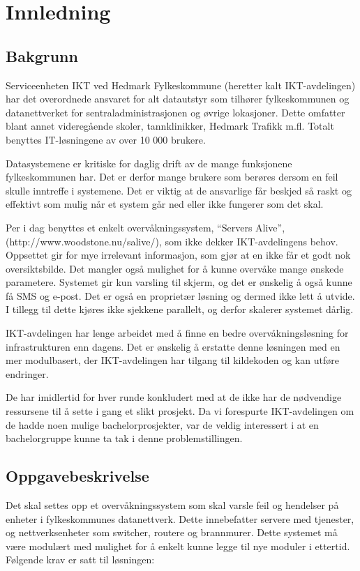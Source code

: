 \section{Innledning}
\subsection{Bakgrunn}
Serviceenheten IKT ved Hedmark Fylkeskommune (heretter kalt IKT-avdelingen) har det overordnede ansvaret for alt datautstyr som tilhører fylkeskommunen og datanettverket for sentraladministrasjonen og øvrige lokasjoner. Dette omfatter blant annet videregående skoler, tannklinikker, Hedmark Trafikk m.fl. Totalt benyttes IT-løsningene av over 10 000 brukere.

Datasystemene er kritiske for daglig drift av de mange funksjonene fylkeskommunen har. Det er derfor mange brukere som berøres dersom en feil skulle inntreffe i systemene. Det er viktig at de ansvarlige får beskjed så raskt og effektivt som mulig når et system går ned eller ikke fungerer som det skal.

Per i dag benyttes et enkelt overvåkningssystem, “Servers Alive”, (http://www.woodstone.nu/salive/), som ikke dekker IKT-avdelingens behov. Oppsettet gir for mye irrelevant informasjon, som gjør at en ikke får et godt nok oversiktsbilde. Det mangler også mulighet for å kunne overvåke mange ønskede parametere. Systemet gir kun varsling til skjerm, og det er ønskelig å også kunne få SMS og e-post. Det er også en proprietær løsning og dermed ikke lett å utvide. I tillegg til dette kjøres ikke sjekkene parallelt, og derfor skalerer systemet dårlig.

IKT-avdelingen har lenge arbeidet med å finne en bedre overvåkningsløsning for infrastrukturen enn dagens. Det er ønskelig å erstatte denne løsningen med en mer modulbasert, der IKT-avdelingen har tilgang til kildekoden og kan utføre endringer.

De har imidlertid for hver runde konkludert med at de ikke har de nødvendige ressursene til å sette i gang et slikt prosjekt. Da vi forespurte IKT-avdelingen om de hadde noen mulige bachelorprosjekter, var de veldig interessert i at en bachelorgruppe kunne ta tak i denne problemstillingen.

\subsection{Oppgavebeskrivelse}
Det skal settes opp et overvåkningssystem som skal varsle feil og hendelser på enheter i fylkeskommunes datanettverk. Dette innebefatter servere med tjenester, og nettverksenheter som switcher, routere og brannmurer. Dette systemet må være modulært med mulighet for å enkelt kunne legge til nye moduler i ettertid. Følgende krav er satt til løsningen:

